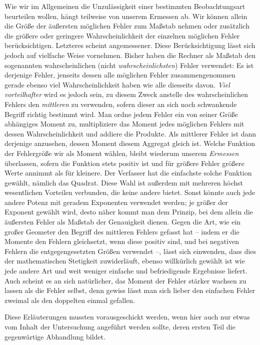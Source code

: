 Wie wir im Allgemeinen die Unzulässigkeit einer bestimmten Beobachtungsart beurteilen wollen, hängt teilweise von unserem Ermessen ab. Wir können allein die Größe der äußersten möglichen Fehler zum Maßstab nehmen oder zusätzlich die größere oder geringere Wahrscheinlichkeit der einzelnen möglichen Fehler berücksichtigen. Letzteres scheint angemessener. Diese Berücksichtigung lässt sich jedoch auf vielfache Weise
vornehmen. Bisher haben die Rechner als Maßstab den sogenannten wahrscheinlichen (nicht \textit{wahrscheinlichsten}) Fehler verwendet: Es ist derjenige Fehler, jenseits dessen alle möglichen Fehler zusammengenommen gerade ebenso viel Wahrscheinlichkeit haben wie alle diesseits davon. \textit{Viel vorteilhafter} wird es jedoch sein, zu diesem Zweck anstelle des wahrscheinlichen Fehlers den \textit{mittleren} zu verwenden, sofern dieser an sich noch schwankende Begriff richtig bestimmt wird. Man ordne jedem Fehler ein von seiner Größe abhängiges Moment zu, multipliziere das Moment jedes möglichen Fehlers mit dessen Wahrscheinlichkeit und addiere die Produkte. Als mittlerer Fehler ist dann derjenige anzusehen, dessen Moment diesem Aggregat gleich ist. Welche Funktion der Fehlergröße wir als Moment wählen, bleibt wiederum unserem \textit{Ermessen} überlassen, sofern die Funktion stets positiv ist und für größere Fehler größere Werte annimmt als für kleinere. Der Verfasser hat die einfachste solche Funktion gewählt, nämlich das Quadrat. Diese Wahl ist außerdem mit mehreren höchst wesentlichen Vorteilen verbunden, die keine andere bietet. Sonst könnte auch jede andere Potenz mit geradem Exponenten verwendet werden; je größer der Exponent gewählt wird, desto näher kommt man dem Prinzip, bei dem allein die äußersten Fehler als Maßstab der Genauigkeit dienen. Gegen die Art, wie ein großer Geometer den Begriff des mittleren Fehlers gefasst hat – indem er die Momente den Fehlern gleichsetzt, wenn diese positiv sind, und bei negativen Fehlern die entgegengesetzten Größen verwendet –, lässt sich einwenden, dass dies der mathematischen Stetigkeit zuwiderläuft, ebenso willkürlich gewählt ist wie jede andere Art und weit weniger einfache und befriedigende Ergebnisse liefert. Auch scheint es an sich natürlicher, das Moment der Fehler stärker wachsen zu lassen als die Fehler selbst, denn gewiss lässt man sich lieber den einfachen Fehler zweimal als den doppelten einmal gefallen.

Diese Erläuterungen mussten vorausgeschickt werden, wenn hier auch nur etwas vom Inhalt der Untersuchung angeführt werden sollte, deren ersten Teil die gegenwärtige Abhandlung bildet.


